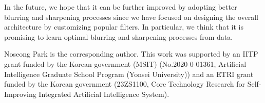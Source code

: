 \documentclass[sigconf,natbib=true]{acmart}
\begin{document}
In the future, we hope that it can be further improved by adopting better blurring and sharpening processes since we have focused on designing the overall architecture by customizing popular filters. In particular, we think that it is promising to learn optimal blurring and sharpening processes from data.

\begin{acks}
Noseong Park is the corresponding author. This work was supported by an IITP grant funded by the Korean government (MSIT) (No.2020-0-01361, Artificial Intelligence Graduate School Program (Yonsei University)) and an ETRI grant funded by the Korean government (23ZS1100, Core Technology Research for Self-Improving Integrated Artificial Intelligence System).
\end{acks}


\end{document}
